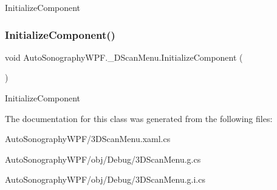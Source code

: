 Initialize\+Component 

\hypertarget{class_auto_sonography_w_p_f_1_1__3_d_scan_menu_a5e15f9a4094b27b93e34a8c3760db6a5}{}\label{class_auto_sonography_w_p_f_1_1__3_d_scan_menu_a5e15f9a4094b27b93e34a8c3760db6a5} 
\subsubsection{\texorpdfstring{Initialize\+Component()}{InitializeComponent()}\hspace{0.1cm}{\footnotesize\ttfamily [4/4]}}
{\footnotesize\ttfamily void Auto\+Sonography\+W\+P\+F.\+\_\+D\+Scan\+Menu.\+Initialize\+Component (\begin{DoxyParamCaption}{ }\end{DoxyParamCaption})}



Initialize\+Component 



The documentation for this class was generated from the following files\+:\begin{DoxyCompactItemize}
\item 
Auto\+Sonography\+W\+P\+F/3\+D\+Scan\+Menu.\+xaml.\+cs\item 
Auto\+Sonography\+W\+P\+F/obj/\+Debug/3\+D\+Scan\+Menu.\+g.\+cs\item 
Auto\+Sonography\+W\+P\+F/obj/\+Debug/3\+D\+Scan\+Menu.\+g.\+i.\+cs\end{DoxyCompactItemize}
